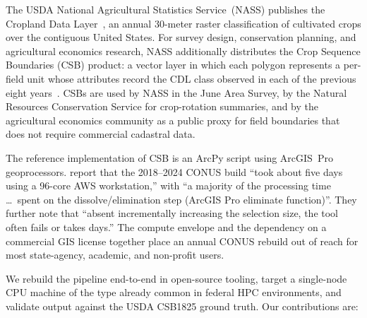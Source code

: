 \documentclass{article}
\begin{document}
The USDA National Agricultural Statistics Service~(NASS) publishes the
Cropland Data Layer~\citep{boryan2011cdl}, an annual 30-meter raster
classification of cultivated crops over the contiguous United States.
For survey design, conservation planning, and agricultural economics
research, NASS additionally distributes the Crop Sequence Boundaries
(CSB) product: a vector layer in which each polygon represents a
per-field unit whose attributes record the CDL class observed in each
of the previous eight years~\citep{hunt2024csb,hunt2024iaos}. CSBs are
used by NASS in the June Area Survey, by the Natural Resources
Conservation Service for crop-rotation summaries, and by the
agricultural economics community as a public proxy for field
boundaries that does not require commercial cadastral data.

The reference implementation of CSB is an ArcPy script using ArcGIS~Pro
geoprocessors. \citet{hunt2024csb} report that the 2018--2024 CONUS
build ``took about five days using a 96-core AWS workstation,'' with
``a majority of the processing time \dots\ spent on the
dissolve/elimination step (ArcGIS Pro eliminate function)''. They
further note that ``absent incrementally increasing the selection size,
the tool often fails or takes days.'' The compute envelope and the
dependency on a commercial GIS license together place an annual
CONUS rebuild out of reach for most state-agency, academic, and
non-profit users.

We rebuild the pipeline end-to-end in open-source tooling, target a
single-node CPU machine of the type already common in federal HPC
environments, and validate output against the USDA CSB1825 ground truth.
Our contributions are:
\end{document}
